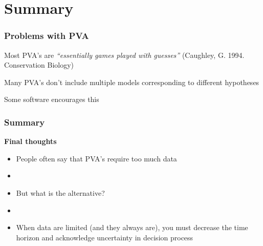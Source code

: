 \documentclass[color=usenames,dvipsnames]{beamer}\usepackage[]{graphicx}\usepackage[]{color}
\begin{document}
\section{Summary}



\begin{frame}
  \frametitle{Problems with PVA}
  \large
  Most PVA's are {\it ``essentially games played with
    guesses''} (Caughley, G. 1994. Conservation Biology) \par
  \pause
  \vspace{0.5cm}
  Many PVA's don't include multiple models corresponding to different
  hypotheses \par
  \pause
  \vspace{0.5cm}
  {Some software encourages this \\}
\end{frame}




\begin{frame}
  \frametitle{Summary}
  \large
  {\bf Final thoughts}
  \begin{itemize}[<+->]
    \item People often say that PVA's require too much data
    \item[]
    \item But what is the alternative?
    \item[]
    \item When data are limited (and they always are), you must
      decrease the time horizon and acknowledge uncertainty in decision process
  \end{itemize}
\end{frame}
\end{document}
